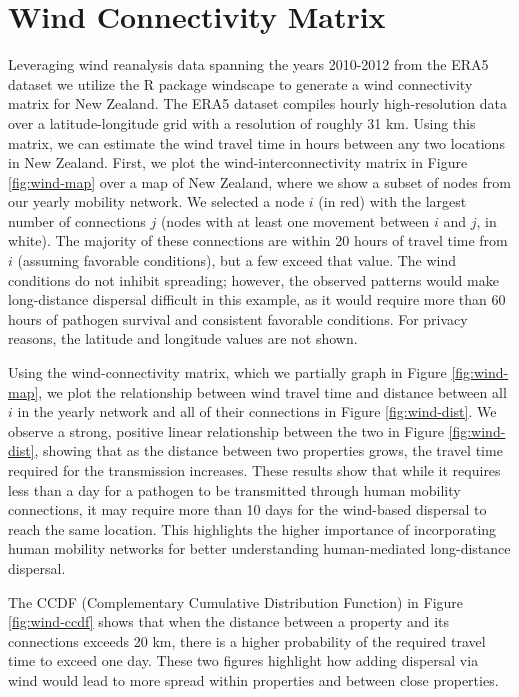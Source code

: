\documentclass[a4paper,aps,superscriptaddress,floatfix,nofootinbib,longbibliography, onecolumn]{revtex4-1}
\begin{document}
\section{Wind Connectivity Matrix}
Leveraging wind reanalysis data spanning the years 2010-2012 from the ERA5 \cite{hersbach2023era5} dataset we utilize the R package windscape \cite{kling2021global} to generate a wind connectivity matrix for New Zealand. The ERA5 dataset compiles hourly high-resolution data over a latitude-longitude grid with a resolution of roughly 31 km. Using this matrix, we can estimate the wind travel time in hours between any two locations in New Zealand. First, we plot the wind-interconnectivity matrix in Figure \ref{fig:wind-map} over a map of New Zealand, where we show a subset of nodes from our yearly mobility network. We selected a node $i$ (in red) with the largest number of connections $j$ (nodes with at least one movement between $i$ and $j$, in white). The majority of these connections are within 20 hours of travel time from $i$ (assuming favorable conditions), but a few exceed that value. The wind conditions do not inhibit spreading; however, the observed patterns would make long-distance dispersal difficult in this example, as it would require more than 60 hours of pathogen survival and consistent favorable conditions. For privacy reasons, the latitude and longitude values are not shown. 

Using the wind-connectivity matrix, which we partially graph in Figure \ref{fig:wind-map},  we plot the relationship between wind travel time and distance between all $i$ in the yearly network and all of their connections in Figure \ref{fig:wind-dist}. We observe a strong, positive linear relationship between the two in Figure \ref{fig:wind-dist}, showing that as the distance between two properties grows, the travel time required for the transmission increases. These results show that while it requires less than a day for a pathogen to be transmitted through human mobility connections, it may require more than 10 days for the wind-based dispersal to reach the same location. This highlights the higher importance of incorporating human mobility networks for better understanding human-mediated long-distance dispersal.

The CCDF (Complementary Cumulative Distribution Function) in Figure \ref{fig:wind-ccdf} shows that when the distance between a property and its connections exceeds 20 km, there is a higher probability of the required travel time to exceed one day. These two figures highlight how adding dispersal via wind would lead to more spread within properties and between close properties.
\end{document}
